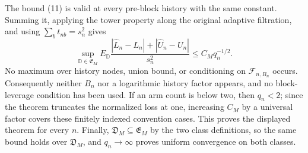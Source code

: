 The bound (11) is valid at every pre-block history with the same constant. Summing it, applying the tower property along the original adaptive filtration, and using \(\sum_bt_{nb}=s_n^2\) gives
\[
\sup_{\mathbb D\in\mathfrak E_M}
E_{\mathbb D}\frac{|\widehat L_n-L_n|+|\widehat U_n-U_n|}{s_n^2}
\le C_Mq_n^{-1/2}.
\tag{12}
\]
No maximum over history nodes, union bound, or conditioning on \(\mathcal F_{n,B_n}\) occurs. Consequently neither \(B_n\) nor a logarithmic history factor appears, and no block-leverage condition has been used. If an arm count is below two, then \(q_n<2\); since the theorem truncates the normalized loss at one, increasing \(C_M\) by a universal factor covers these finitely indexed convention cases. This proves the displayed theorem for every \(n\). Finally, \(\mathfrak D_M\subseteq\mathfrak E_M\) by the two class definitions, so the same bound holds over \(\mathfrak D_M\), and \(q_n\to\infty\) proves uniform convergence on both classes.